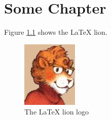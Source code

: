 \documentclass[a4paper]{report}
\begin{document}
\chapter{Some Chapter}
Figure \ref{fig:lion} shows the \LaTeX{} lion.

\begin{figure}[htb]
	\centering
	\includegraphics{latex-lion}
	\caption{The \LaTeX{} lion logo%
	\label{fig:lion}}
\end{figure}

\appendix

\listoffigures
\end{document}
